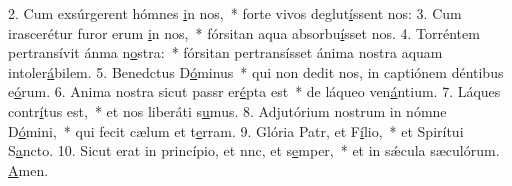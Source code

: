 2. Cum exsúrgerent hómnes \uline{i}n nos,~* forte vivos deglut\uline{í}ssent nos:
3. Cum irascerétur furor erum \uline{i}n nos,~* fórsitan aqua absorbu\uline{í}sset nos.
4. Torréntem pertransívit ánma n\uline{o}stra:~* fórsitan pertransísset ánima nostra aquam intoler\uline{á}bilem.
5. Benedctus D\uline{ó}minus~* qui non dedit nos, in captiónem déntibus e\uline{ó}rum.
6. Anima nostra sicut passr er\uline{é}pta est~* de láqueo ven\uline{á}ntium.
7. Láques contr\uline{í}tus est,~* et nos liberáti s\uline{u}mus.
8. Adjutórium nostrum in nómne D\uline{ó}mini,~* qui fecit cælum et t\uline{e}rram.
9. Glória Patr, et F\uline{í}lio,~* et Spirítui S\uline{a}ncto.
10. Sicut erat in princípio, et nnc, et s\uline{e}mper,~* et in sǽcula sæculórum. \uline{A}men.
